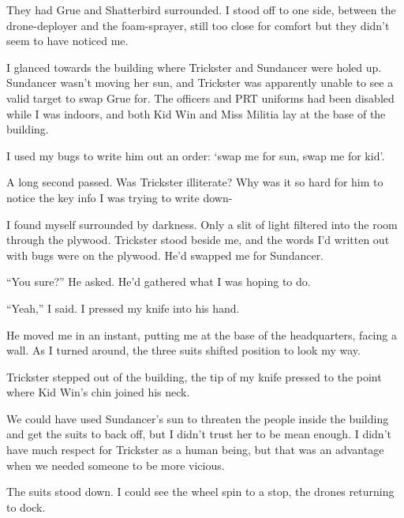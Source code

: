 They had Grue and Shatterbird surrounded.  I stood off to one side, between the drone-deployer and the foam-sprayer, still too close for comfort but they didn't seem to have noticed me.



I glanced towards the building where Trickster and Sundancer were holed up.  Sundancer wasn't moving her sun, and Trickster was apparently unable to see a valid target to swap Grue for.  The officers and PRT uniforms had been disabled while I was indoors, and both Kid Win and Miss Militia lay at the base of the building.



I used my bugs to write him out an order: `swap me for sun, swap me for kid'.



A long second passed.  Was Trickster illiterate?  Why was it so hard for him to notice the key info I was trying to write down-



I found myself surrounded by darkness.  Only a slit of light filtered into the room through the plywood.  Trickster stood beside me, and the words I'd written out with bugs were on the plywood.  He'd swapped me for Sundancer.



``You sure?''  He asked.  He'd gathered what I was hoping to do.



``Yeah,'' I said.  I pressed my knife into his hand.



He moved me in an instant, putting me at the base of the headquarters, facing a wall.  As I turned around, the three suits shifted position to look my way.



Trickster stepped out of the building, the tip of my knife pressed to the point where Kid Win's chin joined his neck.



We could have used Sundancer's sun to threaten the people inside the building and get the suits to back off, but I didn't trust her to be mean enough.  I didn't have much respect for Trickster as a human being, but that was an advantage when we needed someone to be more vicious.



The suits stood down.  I could see the wheel spin to a stop, the drones returning to dock.



